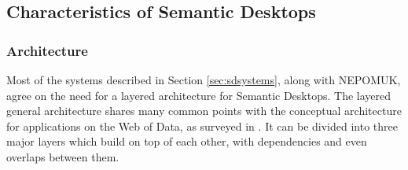 \subsection{Characteristics of Semantic Desktops}
\label{sub:characteristicsofsd}

\subsubsection{Architecture}
\label{sub:architecture}

Most of the systems described in Section \ref{sec:sdsystems}, along with NEPOMUK, agree on the need for a layered architecture for Semantic Desktops. The layered general architecture shares many common points with the conceptual architecture for applications on the Web of Data, as surveyed in \cite{Heitmann2012}.
It can be divided into three major layers which build on top of each other, with dependencies and even overlaps between them.

